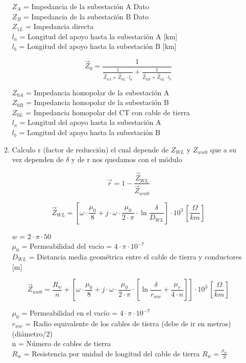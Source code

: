 \documentclass[10pt,a4paper]{article}
\begin{document}
\begin{itemize}
\begin{enumerate}
        $Z_A$ = Impedancia de la subestación A \xleftarrow[]{}Dato\\ 
        $Z_B$ = Impedancia de la subestación B \xleftarrow[]{}Dato\\ 
        $Z_{1L}$ = Impedancia directa \\
        $l_a$ = Longitud del apoyo hasta la subestación A [km] \\
        $l_b$ = Longitud del apoyo hasta la subestación B [km]
        
        $$
        \vec{Z}_{0}=\frac{1}{\frac{1}{\vec{Z}_{0 A}+\vec{Z}_{0 L} \cdot l_{a}}+\frac{1}{\vec{Z}_{0 B}+\vec{Z}_{0 L} \cdot l_{b}}}
        $$
        
        $Z_{0A}$ = Impedancia homopolar de la subestación A \\
        $Z_{0B}$ = Impedancia homopolar de la subestación B \\
        $Z_{0L}$ = Impedancia homopolar del CT con cable de tierra \\
        $l_a$ = Longitud del apoyo hasta la subestación A \\
        $l_b$ = Longitud del apoyo hasta la subestación B
        \item Calculo r (factor de reducción) el cual depende de $Z_{WL}$ y $Z_{ww0}$ que a su vez dependen de $\delta$ y de r nos quedamos con el módulo
        
        $$
        \vec{r}=1-\frac{\vec{Z}_{W L}}{\vec{Z}_{w w 0}}
        $$
        
        $$
        \vec{Z}_{W L}=
         \left[
        \omega \cdot \frac{\mu_{0}}{8}+j \cdot \omega \cdot \frac{\mu_{0}}{2 \cdot \pi} \cdot \ln \frac{\delta}{D_{W L}}
        \right] \cdot 10^3 \, [\frac{\Omega}{km}]
        $$
        
        $w$ = $2 \cdot \pi \cdot 50$ \\
        $\mu_{0}$ = Permeabilidad del vacio = $4 \cdot \pi \cdot 10^{-7}$ \\
        $D_{W L}$ = Distancia media geométrica entre el cable de tierra y conductores [m]
        
        $$
        \vec{Z}_{w w 0}=\frac{R_{w}}{n}+\left[ \omega \cdot \frac{\mu_{0}}{8}+j \cdot \omega \cdot \frac{\mu_{0}}{2 \cdot \pi} \cdot\left[\ln \frac{\delta}{r_{w w}}+\frac{\mu_{r}}{4 \cdot n}\right]\right]\cdot 10^3
        \, [\frac{\Omega}{km}]
        $$
        
        $\mu_{0}$ = Permeabilidad en el vacío = $4 \cdot \pi \cdot 10^{-7}$ \\
        $r_{w w}$ = Radio equivalente de los cables de tierra (debe de ir en metros) (diámetro/2) \\
        n = Número de cables de tierra \\
        $R_w$ = Resistencia por unidad de longitud del cable de tierra $R_w = \frac{\rho_w}{S}$ \\
        

\end{enumerate}
\end{itemize}
\end{document}

